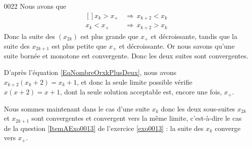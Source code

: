 \begin{corrige}{0022}
Nous avons que 
\begin{equation}
	\begin{aligned}[]
		x_k>x_+\,&\Rightarrow\,x_{k+2}<x_k\\
		x_k<x_+\,&\Rightarrow\,x_{k+2}>x_k
	\end{aligned}
\end{equation}
Donc la suite des $(x_{2k})$ est plus grande que $x_+$ et décroissante, tandis que la suite des $x_{2k+1}$ est plus petite que $x_+$ et décroissante. Or nous savons qu'une suite bornée et monotone est convergente. Donc les deux suites sont convergentes.

D'après l'équation \eqref{EqNombreOrxkPlusDeux}, nous avons $x_{k+2}(x_k+2)=x_k+1$, et donc la seule limite possible vérifie $x(x+2)=x+1$, dont la seule solution acceptable est, encore une fois, $x_+$.

Nous sommes maintenant dans le cas d'une suite $x_k$ donc les deux sous-suites $x_{2k}$ et $x_{2k+1}$ sont convergentes et convergent vers la même limite, c'est-à-dire le cas de la question \ref{ItemAExo0013} de l'exercice \ref{exo0013} : la suite des $x_k$ converge vers $x_+$.

\end{corrige}
